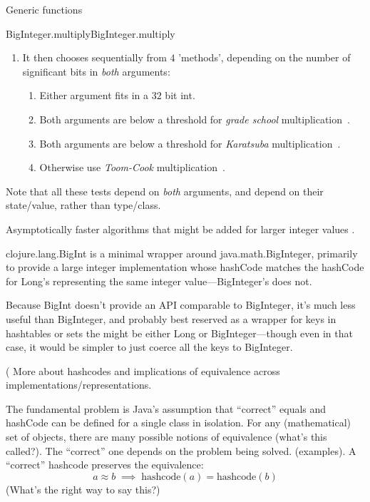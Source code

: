 \documentclass[12pt]{PalisadesLakesBook}
\begin{document}
\begin{plSection}{Generic functions}
\begin{plExample}{{\javaFont BigInteger.multiply}}{BigInteger.multiply}
\begin{enumerate}
\item It then chooses sequentially from $4$ 'methods', 
depending on the number of
significant bits in \textit{both} arguments:
\begin{enumerate}
  \item Either argument fits in a $32$ bit {\javaFont int}.
  \item Both arguments are below a threshold for
  \textit{grade school} 
  multiplication~\cite{wiki:GradeSchoolMultiplication}.
  \item Both arguments are below a threshold for 
  \textit{Karatsuba} multiplication~\cite{wiki:KaratsubaMultiplication}.
  \item Otherwise use \textit{Toom-Cook} 
  multiplication~\cite{wiki:ToomCookMultiplication}.
 
\end{enumerate}
\end{enumerate}

Note that all these tests depend on \textit{both} arguments,
and depend on their state/value, rather than type/class.
\end{plExample}%

Asymptotically faster algorithms that might be added
for larger integer values
\cite{wiki:SchonhageStrassenMultiplication,
 wiki:FurerMultiplication,
 Hartnett:2019:NLogNIntegerMultiplication,
 HarveyVanDerHoeven:2020:NLogNIntegerMultiplication}.

{\javaFont clojure.lang.BigInt} is a minimal wrapper around
{\javaFont java.math.BigInteger}, primarily to provide
a large integer implementation whose {\javaFont hashCode}
matches the {\javaFont hashCode} for {\javaFont Long}'s
representing the same integer value---{\javaFont BigInteger}'s 
does not.~\cite[page 438]{EmerickCarperGrand:2012:ClojureProgramming}

Because {\javaFont BigInt} doesn't provide an API comparable to
{\javaFont BigInteger}, it's much less useful than
{\javaFont BigInteger}, and probably best reserved as a wrapper
for keys in hashtables or sets the might be either
{\javaFont Long} or {\javaFont BigInteger}---though even in that
case, it would be simpler to just coerce all the keys to
{\javaFont BigInteger}.

(\TODO 
More about hashcodes and implications of equivalence across 
implementations/representations.

The fundamental problem is Java's assumption
that ``correct'' {\javaFont equals}
and {\javaFont hashCode} can be defined for a single class
in isolation.
For any (mathematical) set of objects, there are many possible
notions of equivalence (\TODO what's this called?).
The ``correct'' one depends on the problem being solved.
(\TODO examples).
A ``correct'' hashcode preserves the equivalence:
\begin{equation}
a \approx b \; \implies \; \text{hashcode}(a) = \text{hashcode}(b)
\end{equation}
(What's the right way to say this?)


\end{plSection}
\end{document}

